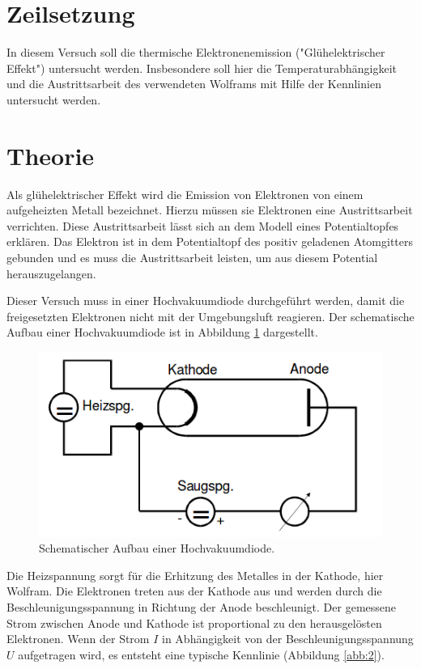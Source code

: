 \section{Zeilsetzung}
In diesem Versuch soll die thermische Elektronenemission ("Glühelektrischer Effekt") untersucht werden. Insbesondere soll hier die
Temperaturabhängigkeit und die Austrittsarbeit des verwendeten Wolframs mit Hilfe der Kennlinien untersucht werden.

\section{Theorie}
Als glühelektrischer Effekt wird die Emission von Elektronen von einem aufgeheizten Metall bezeichnet. Hierzu müssen sie Elektronen eine
Austrittsarbeit verrichten. Diese Austrittsarbeit lässt sich an dem Modell eines Potentialtopfes erklären. Das Elektron ist in dem
Potentialtopf des positiv geladenen Atomgitters gebunden und es muss die Austrittsarbeit leisten, um aus diesem Potential herauszugelangen.

Dieser Versuch muss in einer Hochvakuumdiode durchgeführt werden, damit die freigesetzten Elektronen nicht mit der Umgebungsluft reagieren.
Der schematische Aufbau einer Hochvakuumdiode ist in Abbildung \ref{abb:1} dargestellt.

\begin{figure}
  \centering
  \includegraphics[scale = 0.5]{Hochvakuumdiode.png}
  \caption{Schematischer Aufbau einer Hochvakuumdiode. \cite{Q1}}
  \label{abb:1}
\end{figure}

Die Heizspannung sorgt für die Erhitzung des Metalles in der Kathode, hier Wolfram. Die Elektronen treten aus der Kathode aus
und werden durch die Beschleunigungsspannung in Richtung der Anode beschleunigt. Der gemessene Strom zwischen Anode und Kathode ist proportional
zu den herausgelösten Elektronen. Wenn der Strom $I$ in Abhängigkeit von der Beschleunigungsspannung $U$ aufgetragen wird, es entsteht eine typische
Kennlinie (Abbildung \ref{abb:2}).

